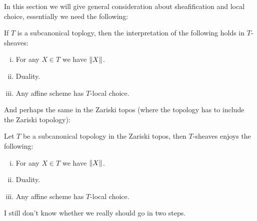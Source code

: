 In this section we will give general consideration about sheafification and local choice, essentially we need the following:

\begin{theorem}\label{main-result-sheaves}
If $T$ is a subcanonical toplogy, then the interpretation of the following holds in $T$-sheaves:
\begin{enumerate}[(i)]
\item For any $X\in T$ we have $\lVert X \rVert$.
\item Duality.
\item Any affine scheme has $T$-local choice.
\end{enumerate}
\end{theorem}

And perhaps the same in the Zariski topos (where the topology has to include the Zariski topology):

\begin{theorem}\label{sheaves-internal}
Let $T$ be a subcanonical topology in the Zariski topos, then $T$-sheaves enjoys the following:
\begin{enumerate}[(i)]
\item For any $X\in T$ we have $\lVert X \rVert$.
\item Duality.
\item Any affine scheme has $T$-local choice.
\end{enumerate}
\end{theorem}

I still don't know whether we really should go in two steps.

